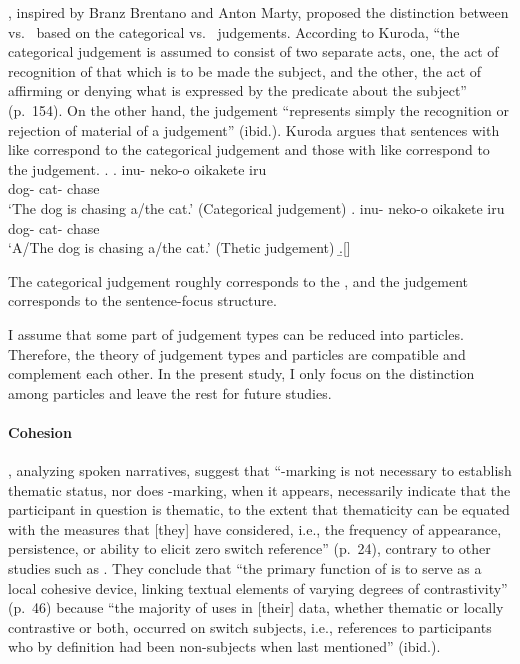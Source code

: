 ,
inspired by Branz Brentano and Anton Marty,
proposed the distinction between  vs.~
based on the categorical vs.~ judgements.
According to Kuroda,
``the categorical judgement is assumed to consist of two separate acts,
one, the act of recognition of that which is to be made the subject,
and the other, the act of affirming or denying what is expressed by the predicate about the subject'' (p.~154).
On the other hand,
the  judgement ``represents simply the recognition or rejection of material of a judgement'' (ibid.).
Kuroda argues that
sentences with  like \Next[a] correspond to the categorical judgement and
those with  like \Next[b] correspond to the  judgement.
%
\ex.
 \ag. inu- neko-o oikakete iru \\
      dog- cat- chase  \\
      `The dog is chasing a/the cat.'
      \hfill{(Categorical judgement)}
 \bg. inu- neko-o oikakete iru \\
      dog- cat- chase  \\
      `A/The dog is chasing a/the cat.'
      \hfill{(Thetic judgement)}
 \b.[] \hfill{\cite[161]{kuroda72}}

The categorical judgement roughly corresponds to the , and
the  judgement corresponds to the sentence-focus structure.

I assume that some part of judgement types can be reduced into particles.
Therefore, the theory of judgement types and particles are compatible and complement each other.
In the present study,
I only focus on the distinction among particles
and leave the rest for future studies.

\paragraph{Cohesion}

,
analyzing spoken narratives, suggest that
``-marking is not necessary to establish thematic status, nor does -marking, when it appears, necessarily indicate that the participant in question is thematic, to the extent that
thematicity can be equated with the measures that [they] have considered,
i.e., the frequency of appearance, persistence, or ability to elicit zero switch reference'' (p.~24),
contrary to other studies such as .
They conclude that
``the primary function of  is to serve as a local cohesive device,
linking textual elements of varying degrees of contrastivity'' (p.~46)
because ``the majority of  uses in [their] data,
whether thematic or locally contrastive or both,
occurred on switch subjects,
i.e., references to participants who by definition had been non-subjects when last mentioned'' (ibid.).


